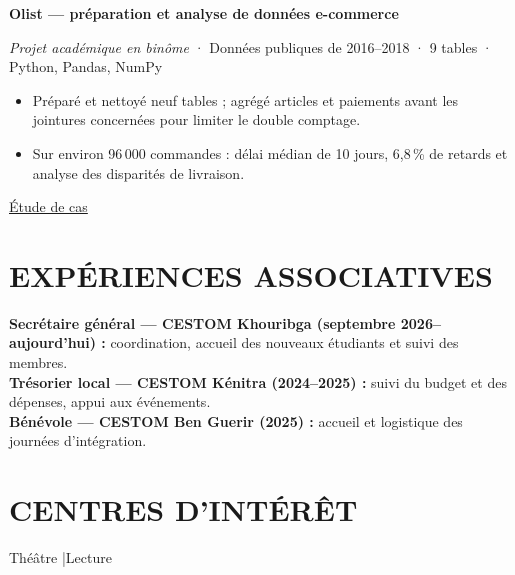 \documentclass[a4paper,10pt]{article}
\newcommand{\projectEntry}[3]{%
  \noindent\textbf{#1}\par
  {\small\textcolor{gris}{\textit{#2} · #3}}\par
  \vspace{2pt}%
}
\newcommand{\compactListStart}{%
  \begin{itemize}[topsep=1pt,itemsep=0pt,parsep=0pt,partopsep=0pt,leftmargin=1.3em]
}
\newcommand{\compactListEnd}{\end{itemize}}
\begin{document}
\projectEntry
  {Olist — préparation et analyse de données e-commerce}
  {Projet académique en binôme}
  {Données publiques de 2016–2018 · 9 tables · Python, Pandas, NumPy}
\compactListStart
  \item Préparé et nettoyé neuf tables ; agrégé articles et paiements avant les jointures concernées pour limiter le double comptage.
  \item Sur environ 96\,000 commandes : délai médian de 10 jours, 6,8\,\% de retards et analyse des disparités de livraison.
\compactListEnd
{\footnotesize\hfill \href{https://godwin-elie-portfolio.vercel.app/projets/olist}{Étude de cas}}

\section{EXPÉRIENCES ASSOCIATIVES}

{\small
\textbf{Secrétaire général — CESTOM Khouribga (septembre 2026–aujourd’hui) :} coordination, accueil des nouveaux étudiants et suivi des membres.\\
\textbf{Trésorier local — CESTOM Kénitra (2024–2025) :} suivi du budget et des dépenses, appui aux événements.\\
\textbf{Bénévole — CESTOM Ben Guerir (2025) :} accueil et logistique des journées d’intégration.
}

\section{CENTRES D'INTÉRÊT}

{\small Théâtre \enspace|\enspace Lecture}
\end{document}
